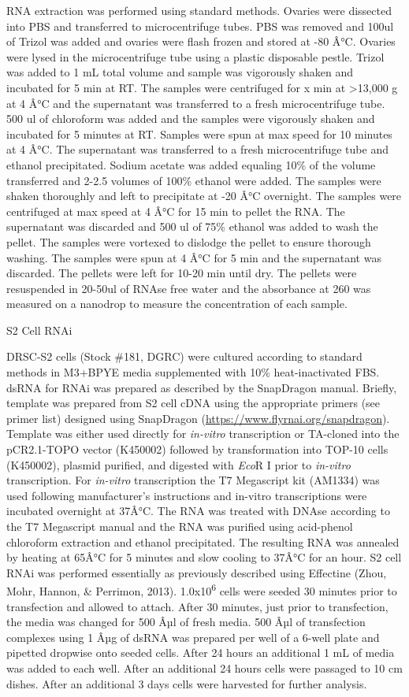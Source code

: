 \documentclass[12pt,twoside]{reedthesis}
\begin{document}
RNA extraction was performed using standard methods. Ovaries were
dissected into PBS and transferred to microcentrifuge tubes. PBS was
removed and 100ul of Trizol was added and ovaries were flash frozen and
stored at -80 Â°C. Ovaries were lysed in the microcentrifuge tube using a
plastic disposable pestle. Trizol was added to 1 mL total volume and
sample was vigorously shaken and incubated for 5 min at RT. The samples
were centrifuged for x min at \textgreater13,000 g at 4 Â°C and the supernatant was
transferred to a fresh microcentrifuge tube. 500 ul of chloroform was
added and the samples were vigorously shaken and incubated for 5 minutes
at RT. Samples were spun at max speed for 10 minutes at 4 Â°C. The
supernatant was transferred to a fresh microcentrifuge tube and ethanol
precipitated. Sodium acetate was added equaling 10\% of the volume
transferred and 2-2.5 volumes of 100\% ethanol were added. The samples
were shaken thoroughly and left to precipitate at -20 Â°C overnight. The
samples were centrifuged at max speed at 4 Â°C for 15 min to pellet the
RNA. The supernatant was discarded and 500 ul of 75\% ethanol was added
to wash the pellet. The samples were vortexed to dislodge the pellet to
ensure thorough washing. The samples were spun at 4 Â°C for 5 min and the
supernatant was discarded. The pellets were left for 10-20 min until
dry. The pellets were resuspended in 20-50ul of RNAse free water and the
absorbance at 260 was measured on a nanodrop to measure the
concentration of each sample.

{S2 Cell RNAi}

DRSC-S2 cells (Stock \#181, DGRC) were cultured according to standard
methods in M3+BPYE media supplemented with 10\% heat-inactivated FBS.
dsRNA for RNAi was prepared as described by the SnapDragon manual.
Briefly, template was prepared from S2 cell cDNA using the appropriate
primers (see primer list) designed using SnapDragon
(\url{https://www.flyrnai.org/snapdragon}). Template was either used
directly for \emph{in-vitro} transcription or TA-cloned into the pCR2.1-TOPO
vector (K450002) followed by transformation into TOP-10 cells (K450002),
plasmid purified, and digested with \emph{Eco}R I prior to \emph{in-vitro}
transcription. For \emph{in-vitro} transcription the T7 Megascript kit
(AM1334) was used following manufacturer's instructions and in-vitro
transcriptions were incubated overnight at 37Â°C. The RNA was treated
with DNAse according to the T7 Megascript manual and the RNA was
purified using acid-phenol chloroform extraction and ethanol
precipitated. The resulting RNA was annealed by heating at 65Â°C for 5
minutes and slow cooling to 37Â°C for an hour. S2 cell RNAi was performed
essentially as previously described using Effectine
(Zhou, Mohr, Hannon, \& Perrimon, 2013). 1.0x10\textsuperscript{6} cells were seeded 30
minutes prior to transfection and allowed to attach. After 30 minutes,
just prior to transfection, the media was changed for 500 Âµl of fresh
media. 500 Âµl of transfection complexes using 1 Âµg of dsRNA was prepared
per well of a 6-well plate and pipetted dropwise onto seeded cells.
After 24 hours an additional 1 mL of media was added to each well. After
an additional 24 hours cells were passaged to 10 cm dishes. After an
additional 3 days cells were harvested for further analysis.
\end{document}
